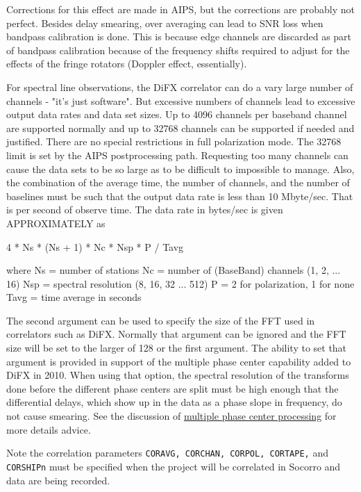 \documentclass{report}
\begin{document}
Corrections for this effect are made in AIPS, but the corrections are
probably not perfect.  Besides delay smearing, over averaging can lead
to SNR loss when bandpass calibration is done.  This is because edge
channels are discarded as part of bandpass calibration because of the
frequency shifts required to adjust for the effects of the fringe
rotators (Doppler effect, essentially).

For spectral line observations, the DiFX correlator can do a vary large
number of channels - "it's just software".  But excessive numbers
of channels lead to excessive output data rates and data set sizes.
Up to 4096 channels per baseband channel are supported normally and
up to 32768 channels can be supported if needed and justified.  There
are no special restrictions in full polarization mode.  The 32768 limit
is set by the AIPS postprocessing path.  Requesting too
many channels can cause the data sets to be so large as to be
difficult to impossible to manage.  Also, the combination of the
average time, the number of channels, and the number of baselines must
be such that the output data rate is less than 10 Mbyte/sec.  That is
per second of observe time.  The
data rate in bytes/sec is given APPROXIMATELY as

    4 * Ns * (Ns + 1) * Nc * Nsp * P / Tavg

 where Ns   = number of stations
       Nc   = number of (BaseBand) channels (1, 2, ... 16)
       Nsp  = spectral resolution (8, 16, 32 ... 512)
       P    = 2 for polarization, 1 for none
       Tavg = time average in seconds

The second argument can be used to specify the size of the FFT used in
correlators such as DiFX.  Normally that argument can be ignored and
the FFT size will be set to the larger of 128 or the first argument.
The ability to set that argument is provided in support of the multiple
phase center capability added to DiFX in 2010.  When using that
option, the spectral resolution of the transforms done before the
different phase centers are split must be high enough that the
differential delays, which show up in the data as a phase slope in
frequency, do not cause smearing.  See the discussion of
{\hyperref[SEC:MULTIPLE_CENTERS]{multiple phase center processing}} for
more details advice.

Note the correlation parameters {\tt CORAVG, CORCHAN,
CORPOL, CORTAPE,} and {\tt CORSHIPn} must be specified when
the project will be correlated in Socorro and data
are being recorded.
\end{document}

